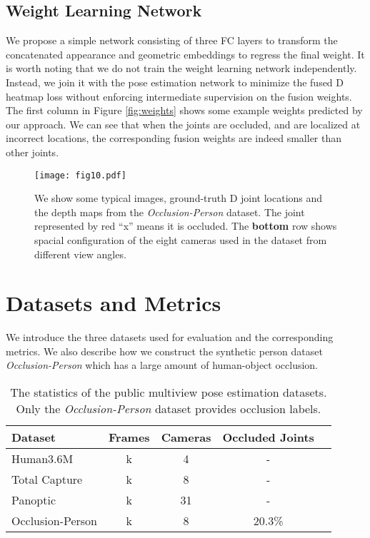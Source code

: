 \subsection{Weight Learning Network}
We propose a simple network consisting of three FC layers to transform the concatenated appearance and geometric embeddings to regress the final weight. It is worth noting that we do not train the weight learning network independently. Instead, we join it with the pose estimation network to minimize the fused D heatmap loss without enforcing intermediate supervision on the fusion weights. The first column in Figure \ref{fig:weights} shows some example weights predicted by our approach. We can see that when the joints are occluded, and are localized at incorrect locations, the corresponding fusion weights are indeed smaller than other joints. 


\begin{figure}
    \centering
    \texttt{[image: fig10.pdf]}
    \caption{We show some typical images, ground-truth D joint locations and the depth maps from the \emph{Occlusion-Person} dataset. The joint represented by red ``x'' means it is occluded. The \textbf{bottom} row shows spacial configuration of the eight cameras used in the dataset from different view angles.}
    \label{fig:occ-dataset}
\end{figure}





\section{Datasets and Metrics}
\label{sec:dataset}
We introduce the three datasets used for evaluation and the corresponding metrics. We also describe how we construct the synthetic person dataset \emph{Occlusion-Person} which has a large amount of human-object occlusion.


\begin{table}[h]
\centering
\caption{The statistics of the public multiview pose estimation datasets. Only the  \emph{Occlusion-Person} dataset provides occlusion labels.}
\label{table:unreal_statis}
\begin{tabular}{lcccc}
\toprule
Dataset          & Frames  & Cameras  & Occluded Joints \\ \hline
Human3.6M        & k & 4       & - \\
Total Capture    & k  & 8       & - \\
Panoptic         & k  & 31        & - \\
Occlusion-Person & k     & 8       & 20.3\%  \\
\toprule
\end{tabular}
\end{table}


